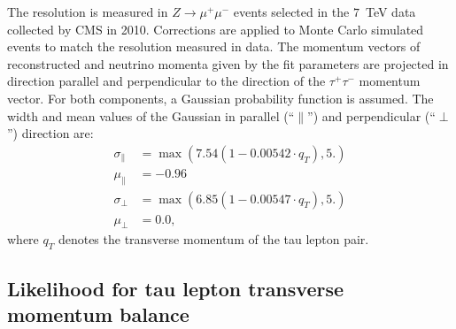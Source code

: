 The \MET resolution is measured in $Z \to \mu^{+} \mu^{-}$ events selected in
the $7$~TeV data collected by CMS in 2010.  Corrections are applied to Monte
Carlo simulated events to match the resolution measured in data.  The momentum
vectors of reconstructed \MET and neutrino momenta given by the fit parameters
are projected in direction parallel and perpendicular to the direction of the
$\tau^{+} \tau^{-}$ momentum vector.  For both components, a Gaussian
probability function is assumed.  The width and mean values of the Gaussian in
parallel (``$\parallel$'') and perpendicular (``$\perp$'') direction are:
\begin{align}
\sigma_\parallel &= \max \left( 7.54 \left( 1 - 0.00542 \cdot q_{T} \right), 5. \right) \nonumber\\
\mu_\parallel &= -0.96 \nonumber \\
\sigma_\perp &= \max \left( 6.85 \left( 1 - 0.00547 \cdot q_{T} \right), 5. \right) \nonumber \\
\mu_\perp &= 0.0, \nonumber
\end{align}
where $q_{T}$ denotes the transverse momentum of the tau lepton pair.


\subsection{Likelihood for tau lepton transverse momentum balance}
\label{sec:ptBalance}

